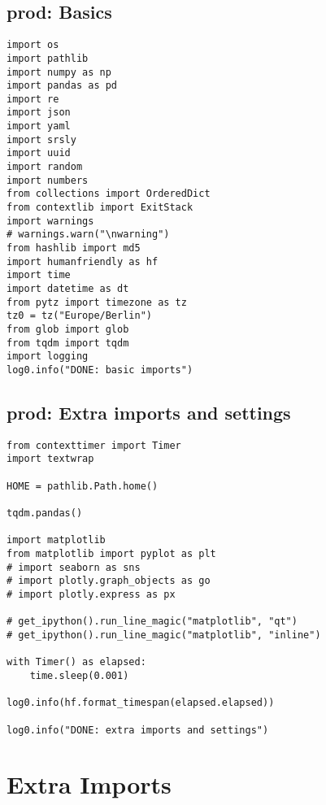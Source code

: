 \documentclass[a4paper,10pt,onecolumn,oneside,openright]{article}
\begin{document}
\subsection{prod: Basics}
\label{sec:orgca93a70}
\begin{verbatim}
import os
import pathlib
import numpy as np
import pandas as pd
import re
import json
import yaml
import srsly
import uuid
import random
import numbers
from collections import OrderedDict
from contextlib import ExitStack
import warnings
# warnings.warn("\nwarning")
from hashlib import md5
import humanfriendly as hf
import time
import datetime as dt
from pytz import timezone as tz
tz0 = tz("Europe/Berlin")
from glob import glob
from tqdm import tqdm
import logging
log0.info("DONE: basic imports")
\end{verbatim}

\subsection{prod: Extra imports and settings}
\label{sec:org4e14664}
\begin{verbatim}
from contexttimer import Timer
import textwrap

HOME = pathlib.Path.home()

tqdm.pandas()

import matplotlib
from matplotlib import pyplot as plt
# import seaborn as sns
# import plotly.graph_objects as go
# import plotly.express as px

# get_ipython().run_line_magic("matplotlib", "qt")
# get_ipython().run_line_magic("matplotlib", "inline")

with Timer() as elapsed:
    time.sleep(0.001)

log0.info(hf.format_timespan(elapsed.elapsed))

log0.info("DONE: extra imports and settings")
\end{verbatim}

\section{Extra Imports}
\label{sec:orgde563f5}
\end{document}
